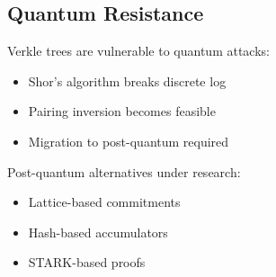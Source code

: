 \subsection{Quantum Resistance}

Verkle trees are vulnerable to quantum attacks:
\begin{itemize}
    \item Shor's algorithm breaks discrete log
    \item Pairing inversion becomes feasible
    \item Migration to post-quantum required
\end{itemize}

Post-quantum alternatives under research:
\begin{itemize}
    \item Lattice-based commitments
    \item Hash-based accumulators
    \item STARK-based proofs
\end{itemize}

